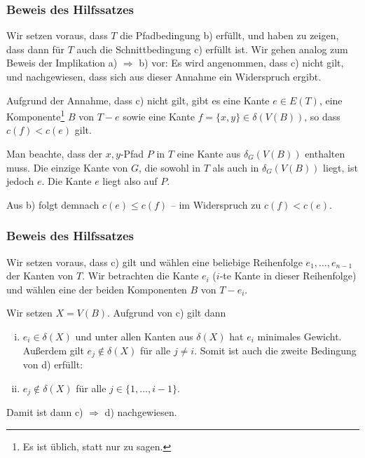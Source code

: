 \documentclass[smaller]{beamer}
\begin{document}
\begin{frame}
\frametitle{Beweis des Hilfssatzes}
 Wir setzen voraus, dass $T$ die Pfadbedingung b) erfüllt, und haben zu zeigen, dass dann für $T$ auch die Schnittbedingung c) erfüllt ist. Wir gehen analog zum Beweis der Implikation a) $\Rightarrow$ b) vor: \alert{Es wird angenommen, dass c) nicht gilt, und nachgewiesen, dass sich aus dieser Annahme ein Widerspruch ergibt.} \medskip

Aufgrund der Annahme, dass c) nicht gilt, gibt es eine Kante $e \in E(T)$, eine Komponente\footnote{Es ist üblich, statt  nur  zu sagen.} $B$ von $T-e$ sowie eine Kante $f=\bigl\{ x,y\bigr\} \in \delta(V(B))$, so dass $c(f) < c(e)$ gilt.\medskip

Man beachte, dass der $x,y$-Pfad $P$ in $T$ eine Kante aus $\delta_G(V(B))$ enthalten muss. Die einzige Kante von $G$, die sowohl in $T$ als auch in $\delta_G(V(B))$ liegt, ist jedoch $e$. Die Kante $e$ liegt also auf $P$. \medskip

Aus b) folgt demnach $c(e) \leq c(f)$ -- im Widerspruch zu $c(f) < c(e)$.

\medskip

\end{frame}

\begin{frame}
\frametitle{Beweis des Hilfssatzes}
 Wir setzen voraus, dass c) gilt und wählen eine \alert{beliebige} Reihenfolge $e_1,\ldots,e_{n-1}$ der Kanten von $T$. Wir betrachten die Kante $e_i$ ($i$-te Kante in dieser Reihenfolge) und wählen eine der beiden Komponenten $B$ von $T-e_i$.

 Wir setzen $X = V(B)$. Aufgrund von c) gilt dann 
 \begin{enumerate}[i)]
   \item $e_i \in \delta(X)$ und unter allen Kanten aus $\delta(X)$ hat $e_i$ minimales Gewicht. Außerdem gilt $e_j \not\in \delta(X)$ für alle $j \neq i$. Somit ist auch die zweite Bedingung  von d) erfüllt:
  \item $e_j \notin \delta(X)$ für alle $j \in \{1, \ldots, i-1\}$.
 \end{enumerate}
Damit ist dann c) $\Rightarrow$ d) nachgewiesen.
\end{frame}
\end{document}
